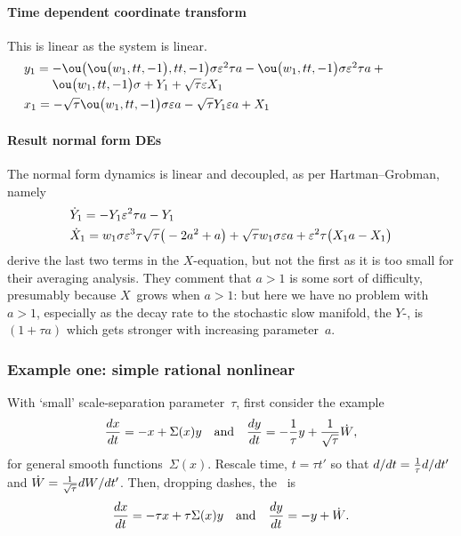 \paragraph{Time dependent coordinate transform}  This is linear as the system is linear.
\begin{align*}&
y_{1}=\ParMath{-\ou\big(\ou\big(w_{1},tt,-1\big),tt,-1\big) \sigma  \eps^{2} 
\tau  a-\ou\big(w_{1},tt,-1\big) \sigma  \eps^{2} \tau  a+\ou\big(w_{1},
tt,-1\big) \sigma +Y_{1}+\sqrt {\tau } \eps X_{1}
}
\\&
x_{1}=-\sqrt {\tau } \ou\big(w_{1},tt,-1\big) \sigma  \eps a-\sqrt {
\tau } Y_{1} \eps a+X_{1}
\end{align*}

\paragraph{Result normal form DEs}
The normal form dynamics is linear and decoupled, as per Hartman--Grobman, namely
\begin{align*}&
\dot Y_{1}=-Y_{1} \varepsilon^{2} \tau  a-Y_{1}
\\&
\dot X_{1}=w_{1} \sigma  \varepsilon^{3} \tau\sqrt {\tau }  \big(-2 a^{2}+
 a\big)+\sqrt {\tau } w_{1} \sigma  \varepsilon a+\varepsilon^{2} \tau  
\big(X_{1} a-X_{1}\big)
\end{align*}
\cite{Monahan2011} derive the last two terms in the $X$-equation, but not the first as it is too small for their averaging analysis.
They comment that $a>1$ is some sort of difficulty, presumably because \(X\)~grows when \(a>1\): but here we have no problem with $a>1$, especially as the decay rate to the stochastic slow manifold, the $Y$-\sde, is $(1+\tau a)$ which gets stronger with increasing parameter~$a$.





\subsubsection{Example one: simple rational nonlinear}

With `small' scale-separation parameter~\(\tau\), \cite{Monahan2011} first consider the example
\begin{equation*}
\de tx=-x+\Sigma(x)y \qtq{and}
\de ty=-\frac1\tau y+\frac1{\sqrt\tau}\dot W,
\end{equation*}
for general smooth functions~$\Sigma(x)$.
Rescale time, $t=\tau t'$  so that $\de t{}=\frac1\tau\de{t'}{}$ and $\dot W=\frac1{\sqrt{\tau}}\de {t'}W$.
Then, dropping dashes, the \sde\ is
\begin{equation*}
\de tx=-\tau x+\tau\Sigma(x)y
\qtq{and}
\de ty=- y+\dot W.
\end{equation*}

